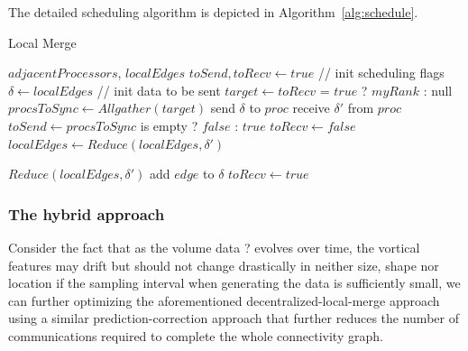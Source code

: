 \documentclass[10pt, conference, compsocconf]{IEEEtran}
\begin{document}
The detailed scheduling algorithm is depicted in Algorithm~\ref{alg:schedule}.
\begin{algorithm}
\caption{Local Merge}
\label{alg:schedule}
  \begin{algorithmic}[1]
  \REQUIRE $adjacentProcessors$, $localEdges$
  \STATE $toSend, toRecv \leftarrow true$	// init scheduling flags
  \STATE $\delta \leftarrow localEdges$	// init data to be sent
  	\STATE $target \leftarrow toRecv$ = $true$ ? $myRank$ : null
  	\STATE $procsToSync \leftarrow Allgather(target)$
  			\STATE send $\delta$ to $proc$
  		\ENDIF
  			\STATE receive $\delta\prime$ from $proc$
  		\ENDIF
  	\ENDFOR
  	\STATE $toSend \leftarrow procsToSync$ is empty ? $false$ : $true$
  	\STATE $toRecv \leftarrow false$
  	\STATE $localEdges \leftarrow Reduce(localEdges, \delta\prime)$
  \ENDWHILE
  \end{algorithmic}
  \begin{algorithmic} \STATE \end{algorithmic}	%
  \begin{algorithmic}[1]
  \STATE $Reduce(localEdges, \delta\prime)$
  			\STATE add $edge$ to $\delta$
  			\STATE $toRecv \leftarrow true$
  		\ENDIF
  	\ENDFOR	
  \end{algorithmic}
\end{algorithm}

\subsubsection{The hybrid approach}

Consider the fact that as the {volume data ?} evolves over time, the vortical features may drift but should not change drastically in neither size, shape nor location if the sampling interval when generating the data is sufficiently small, we can further optimizing the aforementioned decentralized-local-merge approach using a similar prediction-correction approach that further reduces the number of communications required to complete the whole connectivity graph.
\end{document}
